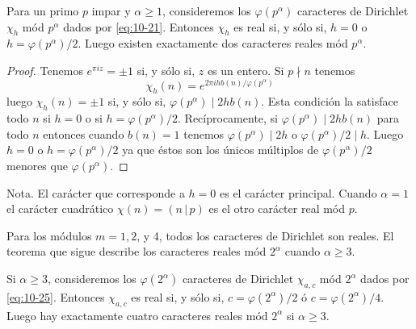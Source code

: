 \documentclass[12pt,a4paper]{book}
\begin{document}
    \begin{teorema}\label{teo:10-12}
        Para un primo $p$ impar y $\alpha\geq1$, consideremos los $\varphi(p^{\alpha})$
        caracteres de Dirichlet $\chi_{h}$ mód $p^{\alpha}$ dados por \eqref{eq:10-21}.
        Entonces $\chi_{h}$ es real si, y sólo si, $h=0$ o $h=\varphi(p^{\alpha})/2$. Luego
        existen exactamente dos caracteres reales mód $p^{\alpha}$.
    \end{teorema}

    \begin{proof}
        Tenemos $e^{\pi iz}=\pm1$ si, y sólo si, $z$ es un entero. Si $p\nmid n$ tenemos
        \begin{equation*}
            \chi_{h}(n)=e^{2\pi ihb(n)/\varphi(p^{\alpha})}
        \end{equation*}
        luego $\chi_{h}(n)=\pm1$ si, y sólo si, $\varphi(p^{\alpha})\mid2hb(n)$. Esta condición
        la satisface todo $n$ si $h=0$ o si $h=\varphi(p^{\alpha})/2$. Recíprocamente, si
        $\varphi(p^{\alpha})\mid2hb(n)$ para todo $n$ entonces cuando $b(n)=1$ tenemos
        $\varphi(p^{\alpha})\mid2h$ o $\varphi(p^{\alpha})/2\mid h$. Luego $h=0$ o
        $h=\varphi(p^{\alpha})/2$ ya que éstos son los únicos múltiplos de
        $\varphi(p^{\alpha})/2$ menores que $\varphi(p^{\alpha})$.
    \end{proof}

    Nota. El carácter que corresponde a $h=0$ es el carácter principal. Cuando $\alpha=1$ el
    carácter cuadrático $\chi(n)=(n\,|\,p)$ es el otro carácter real mód $p$.

    Para los módulos $m=1,2$, y 4, todos los caracteres de Dirichlet son reales. El teorema
    que sigue describe los caracteres reales mód $2^{\alpha}$ cuando $\alpha\geq3$.

    \begin{teorema}\label{teo:10-13}
        Si $\alpha\geq3$, consideremos los $\varphi(2^{\alpha})$ caracteres de Dirichlet
        $\chi_{a,c}$ mód $2^{\alpha}$ dados por \eqref{eq:10-25}. Entonces $\chi_{a,c}$ es
        real si, y sólo si, $c=\varphi(2^{\alpha})/2$ ó $c=\varphi(2^{\alpha})/4$. Luego hay
        exactamente cuatro caracteres reales mód $2^{\alpha}$ si $\alpha\geq3$.
    \end{teorema}
\end{document}
